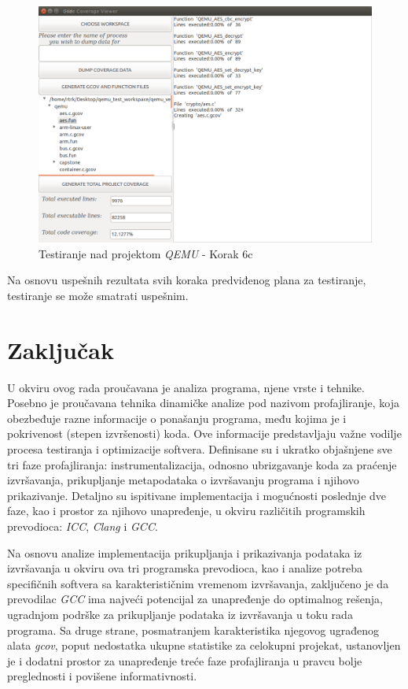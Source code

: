 \documentclass[12pt,oneside]{memoir}
\newcommand{\strano}[1]{\textit{#1}}
\begin{document}
\begin{figure}[!ht]
  \centering
  \includegraphics[width=\textwidth]{img/qemu-test-6c-ng.png}
  \caption{Testiranje nad projektom \strano{QEMU} - Korak 6c}
  \label{fig:qemu-test-6c}
\end{figure} 

Na osnovu uspešnih rezultata svih koraka predviđenog plana za testiranje, testiranje se može smatrati uspešnim.


\chapter{Zaključak}

U okviru ovog rada proučavana je analiza programa, njene vrste i tehnike. Posebno je proučavana tehnika dinamičke analize pod nazivom profajliranje, koja obezbeđuje razne informacije o ponašanju programa, među kojima je i pokrivenost (stepen izvršenosti) koda. Ove informacije predstavljaju važne vodilje procesa testiranja i optimizacije softvera. Definisane su i ukratko objašnjene sve tri faze profajliranja: instrumentalizacija, odnosno ubrizgavanje koda za praćenje izvršavanja, prikupljanje metapodataka o izvršavanju programa i njihovo prikazivanje. Detaljno su ispitivane implementacija i mogućnosti poslednje dve faze, kao i prostor za njihovo unapređenje, u okviru različitih programskih prevodioca: \strano{ICC}, \strano{Clang} i \strano{GCC}.

Na osnovu analize implementacija prikupljanja i prikazivanja podataka iz izvršavanja u okviru ova tri programska prevodioca, kao i analize potreba specifičnih softvera sa karakterističnim vremenom izvršavanja, zaključeno je da prevodilac \strano{GCC} ima najveći potencijal za unapređenje do optimalnog rešenja, ugradnjom podrške za prikupljanje podataka iz izvršavanja u toku rada programa. Sa druge strane, posmatranjem karakteristika njegovog ugrađenog alata \strano{gcov}, poput nedostatka ukupne statistike za celokupni projekat, ustanovljen je i dodatni prostor za unapređenje treće faze profajliranja u pravcu bolje preglednosti i povišene informativnosti.
\end{document}
